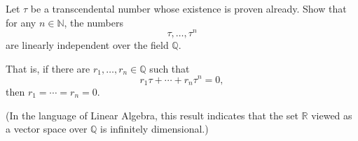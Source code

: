 \begin{exercise}
  \label{ex:hw01:linear-independence}
  Let $\tau$ be a transcendental number whose existence is proven already.
  Show that for any $n\in\mathbb{N}$, the numbers
  \[
    \tau,\ldots,\tau^n
  \]
  are linearly independent over the field $\mathbb{Q}$.

  That is, if there are $r_1,\ldots,r_n\in\mathbb{Q}$ such that
  \[
    r_1\tau+\cdots+r_n\tau^n=0,
  \]
  then $r_1=\cdots=r_n=0$.

  (In the language of Linear Algebra, this result indicates that the set
  $\mathbb{R}$ viewed as a vector space over $\mathbb{Q}$ is infinitely
  dimensional.)
\end{exercise}
